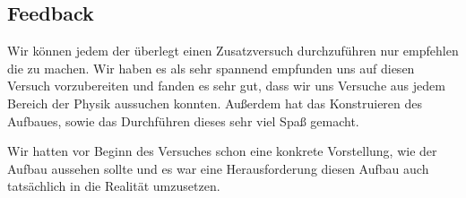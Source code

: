 \subsection{Feedback}

Wir können jedem der überlegt einen Zusatzversuch durchzuführen nur empfehlen
die zu machen. Wir haben es als sehr spannend empfunden  uns auf
diesen Versuch vorzubereiten und fanden es sehr gut, dass
wir uns Versuche aus jedem Bereich der Physik aussuchen konnten.
Außerdem hat das Konstruieren des Aufbaues, sowie das Durchführen dieses
sehr viel Spaß gemacht.

Wir hatten vor Beginn des Versuches schon eine
konkrete Vorstellung, wie der Aufbau aussehen sollte und es war
eine Herausforderung diesen Aufbau auch tatsächlich in die
Realität umzusetzen.


